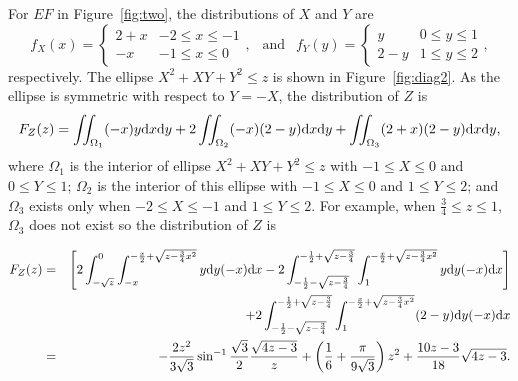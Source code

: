 \documentclass[12pt,draftclsnofoot,onecolumn]{IEEEtran}
\begin{document}
For $EF$ in Figure~\ref{fig:two}, the distributions of $X$ and $Y$ are
\begin{equation}
  f_X(x)=\left\{
    \begin{array}{lr}
      2+x & -2\leq x \leq -1 \\
      -x & -1 \leq x \leq 0
    \end{array}
  \right.,
  ~~\mbox{ and }~~ f_Y(y)=\left\{
    \begin{array}{lr}
      y & 0\leq y \leq 1 \\
      2-y & 1 \leq y \leq 2
    \end{array}
  \right.,
\end{equation}
respectively.
The ellipse $X^2+XY+Y^2 \leq z$ is shown in Figure~\ref{fig:diag2}. As the
ellipse is symmetric with respect to $Y=-X$, the distribution of $Z$ is
\begin{equation}\label{eq:fz_shortdiag}
 F_Z(z)=\iint_{\Omega_1}(-x)y{\rm d}x{\rm d}y+2\iint_{\Omega_2}(-x)(2-y){\rm
d}x{\rm d}y+\iint_{\Omega_3}(2+x)(2-y){\rm d}x{\rm d}y,
\end{equation}
where $\Omega_1$ is the interior of ellipse $X^2+XY+Y^2 \leq z$ with $-1 \leq X
\leq 0$ and $0 \leq Y \leq 1$; $\Omega_2$ is the interior of this ellipse with
$-1 \leq X \leq 0$ and $1 \leq Y \leq 2$; and $\Omega_3$ exists only when $-2 \leq X \leq
-1$ and $1 \leq Y \leq 2$.
For example, when $\frac{3}{4} \leq z \leq 1$,
$\Omega_3$ does not exist so the distribution of $Z$ is
\begin{small}
 \begin{eqnarray}\label{eq:Z2_r_diag2}
 F_Z(z)&=&\left[2\int_{-\sqrt{z}}^0\int_{-x}^{-\frac{x}{2}+\sqrt{z-\frac{3}{4}
x^2}}y{\rm d}y(-x){\rm
d}x-2\int_{-\frac{1}{2}-\sqrt{z-\frac{3}{4}}}^{-\frac{1}{2}+\sqrt{
z-\frac{3}{4}}}\int_1^{-\frac{x}{2}+\sqrt{z-\frac{3}{4}x^2}}y{\rm d}y(-x){\rm
d}x\right] \nonumber\\
&&+2\int_{-\frac{1}{2}-\sqrt{z-\frac{3}{4}}}^{-\frac{1}{2}+\sqrt{z-\frac{3}{4}}}
\int_1^{-\frac{x}{2}+\sqrt{z-\frac{3}{4}x^2}}(2-y){\rm d}y(-x){\rm d}x
\nonumber\\
&=&-\frac{2z^2}{3\sqrt{3}}\sin^{-1}\frac{\sqrt{3}}{2}\frac{\sqrt{4z-3}}{z}
+\left(\frac{1}{6}+\frac{\pi}{9\sqrt{3}}\right)z^2+\frac{10z-3}{18}\sqrt{4z-3}.
\end{eqnarray}
\end{small}
\end{document}
